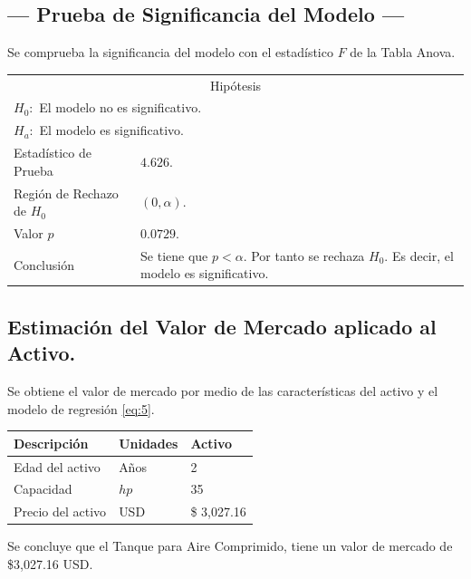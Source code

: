 \subsection{\centering --- Prueba de Significancia del Modelo ---} %
Se comprueba la significancia del modelo con el estadístico \(F\) de la Tabla Anova.
\begin{center}
  \begin{tabular}{|l|p{6cm}|}
    \cline{1-2}
    \multicolumn{2}{|c|}{Hipótesis}\\ \cline{1-2}
    \multicolumn{2}{|l|}{\(H_0:\) El modelo no es significativo.} \\ 
    \multicolumn{2}{|l|}{\(H_a:\) El modelo es significativo.} \\ \cline{1-2}
    Estadístico de Prueba & \(4.626\).\\ \cline{1-2} 
		Región de Rechazo de \(H_0\) & \((0, \alpha )\).\\ \cline{1-2} 
    Valor \(p\) & \(0.0729\).\\ \cline{1-2} 
    Conclusión & Se tiene que \(p<\alpha\). \newline 
		Por tanto se rechaza \(H_0\). \newline 
		Es decir, el modelo es significativo.\\ \cline{1-2} 
  \end{tabular}
\end{center} 

\subsection{\centering Estimación del Valor de Mercado aplicado al Activo.} %
Se obtiene el valor de mercado por medio de las características del activo y el modelo de regresión \eqref{eq:5}.
\begin{center}
  \begin{tabular}{|l|l|l|}
    \hline 
		Descripción   & Unidades  & Activo \\ \hline 
    Edad del activo    & Años      & 2      \\ \hline 
		Capacidad  & \(hp\) & 35   \\ \hline 
		Precio del activo   & USD       & \$ 3,027.16 \\ \hline 
  \end{tabular}
\end{center} 
Se concluye que el Tanque para Aire Comprimido, tiene un valor de mercado de 
\$3,027.16 USD.



